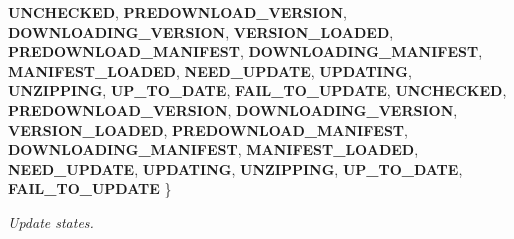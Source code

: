 \begin{DoxyCompactItemize}
{\bfseries U\+N\+C\+H\+E\+C\+K\+ED}, 
{\bfseries P\+R\+E\+D\+O\+W\+N\+L\+O\+A\+D\+\_\+\+V\+E\+R\+S\+I\+ON}, 
{\bfseries D\+O\+W\+N\+L\+O\+A\+D\+I\+N\+G\+\_\+\+V\+E\+R\+S\+I\+ON}, 
{\bfseries V\+E\+R\+S\+I\+O\+N\+\_\+\+L\+O\+A\+D\+ED}, 
\newline
{\bfseries P\+R\+E\+D\+O\+W\+N\+L\+O\+A\+D\+\_\+\+M\+A\+N\+I\+F\+E\+ST}, 
{\bfseries D\+O\+W\+N\+L\+O\+A\+D\+I\+N\+G\+\_\+\+M\+A\+N\+I\+F\+E\+ST}, 
{\bfseries M\+A\+N\+I\+F\+E\+S\+T\+\_\+\+L\+O\+A\+D\+ED}, 
{\bfseries N\+E\+E\+D\+\_\+\+U\+P\+D\+A\+TE}, 
\newline
{\bfseries U\+P\+D\+A\+T\+I\+NG}, 
{\bfseries U\+N\+Z\+I\+P\+P\+I\+NG}, 
{\bfseries U\+P\+\_\+\+T\+O\+\_\+\+D\+A\+TE}, 
{\bfseries F\+A\+I\+L\+\_\+\+T\+O\+\_\+\+U\+P\+D\+A\+TE}, 
\newline
{\bfseries U\+N\+C\+H\+E\+C\+K\+ED}, 
{\bfseries P\+R\+E\+D\+O\+W\+N\+L\+O\+A\+D\+\_\+\+V\+E\+R\+S\+I\+ON}, 
{\bfseries D\+O\+W\+N\+L\+O\+A\+D\+I\+N\+G\+\_\+\+V\+E\+R\+S\+I\+ON}, 
{\bfseries V\+E\+R\+S\+I\+O\+N\+\_\+\+L\+O\+A\+D\+ED}, 
\newline
{\bfseries P\+R\+E\+D\+O\+W\+N\+L\+O\+A\+D\+\_\+\+M\+A\+N\+I\+F\+E\+ST}, 
{\bfseries D\+O\+W\+N\+L\+O\+A\+D\+I\+N\+G\+\_\+\+M\+A\+N\+I\+F\+E\+ST}, 
{\bfseries M\+A\+N\+I\+F\+E\+S\+T\+\_\+\+L\+O\+A\+D\+ED}, 
{\bfseries N\+E\+E\+D\+\_\+\+U\+P\+D\+A\+TE}, 
\newline
{\bfseries U\+P\+D\+A\+T\+I\+NG}, 
{\bfseries U\+N\+Z\+I\+P\+P\+I\+NG}, 
{\bfseries U\+P\+\_\+\+T\+O\+\_\+\+D\+A\+TE}, 
{\bfseries F\+A\+I\+L\+\_\+\+T\+O\+\_\+\+U\+P\+D\+A\+TE}
 \}\begin{DoxyCompactList}\small\item\em Update states. \end{DoxyCompactList}
\end{DoxyCompactItemize}
